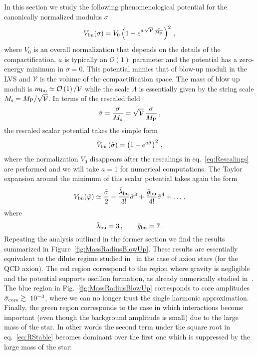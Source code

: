 \documentclass[11pt,a4paper]{article}
\newcommand{\V}{\mathcal{V}}
\begin{document}
In this section we study the following phenomenological potential for the canonically normalized modulus $\sigma$
\begin{equation}
V_{\rm bu} (\sigma) = V_0 \left(1 - e^{a\, \sqrt{\V} \,\frac{\sigma}{M_{\rm P}}}\right)^2 \,,
\end{equation}
where $V_0$ is an overall normalization that depends on the details of the compactification, $a$ is typically an $\mathcal{O}(1)$ parameter and the potential has a zero-energy minimum in $\sigma = 0$. This potential mimics that of blow-up moduli in the LVS and $\V$ is the volume of the compactification space. The mass of blow up moduli is $m_{\rm bu} \simeq \mathcal{O}\left(1\right)/\V$ while the scale $\Lambda$ is essentially given by the string scale $M_{\rm s} = M_{\rm P}/\sqrt{\V}$. In terms of the rescaled field
\begin{equation}
\tilde{\sigma} = \frac{\sigma}{M_s} = \sqrt{\V} \,\frac{\sigma}{M_{\rm P}} \,,
\end{equation}
the rescaled scalar potential takes the simple form
\begin{equation}
\tilde{V}_{\rm bu}\left(\tilde{\sigma}\right) = \left(1 - e^{a \tilde{\sigma}}\right)^2 \,,
\end{equation}
where the normalization $V_0$ disappears after the rescalings in eq.~\eqref{eq:Rescalings} are performed and we will take $a=1$ for numerical computations. The Taylor expansion around the minimum of this scalar potential takes again the form
\begin{equation}
V_{\rm bu}(\tilde{\varphi}) \simeq \frac{\tilde{\sigma}}{2} - \frac{\tilde{\lambda}_{\rm bu}}{3!} \tilde\sigma^3 + \frac{\tilde{g}_{\rm bu}}{4!} \tilde\sigma^4 + \dots \,,
\end{equation}
where
\begin{equation}
\tilde{\lambda}_{\rm bu} = 3 \,, \qquad \tilde{g}_{\rm bu} = 7 \,.
\end{equation}
Repeating the analysis outlined in the former section we find the results summarized in Figure~\ref{fig:MassRadiusBlowUp}. These results are essentially equivalent to the dilute regime studied in~\cite{Visinelli:2017ooc} in the case of axion stars (for the QCD axion). The red region correspond to the region where gravity is negligible and the potential supports oscillon formation, as already numerically studied in~\cite{Antusch:2017flz}. The blue region in Fig.~\ref{fig:MassRadiusBlowUp} corresponds to core amplitudes $\tilde\sigma_{\rm core }\gtrsim~10^{-3}$, where we can no longer trust the single harmonic approximation. Finally, the green region corresponds to the case in which interactions become important (even though the background amplitude is small) due to the large mass of the star. In other words the second term under the square root in eq.~\eqref{eq:RStable} becomes dominant over the first one which is suppressed by the large mass of the star:
\end{document}
